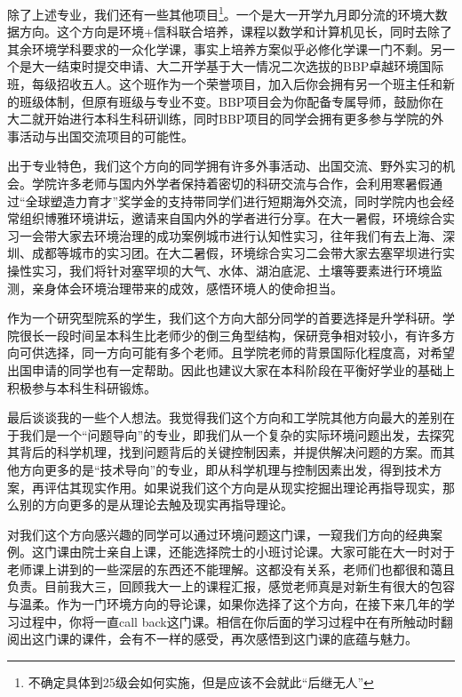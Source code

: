 \vspace{10pt}

除了上述专业，我们还有一些其他项目\footnote{不确定具体到25级会如何实施，但是应该不会就此“后继无人”}。一个是大一开学九月即分流的环境大数据方向。这个方向是环境+信科联合培养，课程以数学和计算机见长，同时去除了其余环境学科要求的一众化学课，事实上培养方案似乎必修化学课一门不剩。另一个是大一结束时提交申请、大二开学基于大一情况二次选拔的BBP卓越环境国际班，每级招收五人。这个班作为一个荣誉项目，加入后你会拥有另一个班主任和新的班级体制，但原有班级与专业不变。BBP项目会为你配备专属导师，鼓励你在大二就开始进行本科生科研训练，同时BBP项目的同学会拥有更多参与学院的外事活动与出国交流项目的可能性。

\vspace{10pt}

出于专业特色，我们这个方向的同学拥有许多外事活动、出国交流、野外实习的机会。学院许多老师与国内外学者保持着密切的科研交流与合作，会利用寒暑假通过“全球塑造力育才”奖学金的支持带同学们进行短期海外交流，同时学院内也会经常组织博雅环境讲坛，邀请来自国内外的学者进行分享。在大一暑假，环境综合实习一会带大家去环境治理的成功案例城市进行认知性实习，往年我们有去上海、深圳、成都等城市的实习团。在大二暑假，环境综合实习二会带大家去塞罕坝进行实操性实习，我们将针对塞罕坝的大气、水体、湖泊底泥、土壤等要素进行环境监测，亲身体会环境治理带来的成效，感悟环境人的使命担当。

\vspace{10pt}

作为一个研究型院系的学生，我们这个方向大部分同学的首要选择是升学科研。学院很长一段时间呈本科生比老师少的倒三角型结构，保研竞争相对较小，有许多方向可供选择，同一方向可能有多个老师。且学院老师的背景国际化程度高，对希望出国申请的同学也有一定帮助。因此也建议大家在本科阶段在平衡好学业的基础上积极参与本科生科研锻炼。

\vspace{10pt}

最后谈谈我的一些个人想法。我觉得我们这个方向和工学院其他方向最大的差别在于我们是一个“问题导向”的专业，即我们从一个复杂的实际环境问题出发，去探究其背后的科学机理，找到问题背后的关键控制因素，并提供解决问题的方案。而其他方向更多的是“技术导向”的专业，即从科学机理与控制因素出发，得到技术方案，再评估其现实作用。如果说我们这个方向是从现实挖掘出理论再指导现实，那么别的方向更多的是从理论去触及现实再指导理论。

\vspace{10pt}

对我们这个方向感兴趣的同学可以通过环境问题这门课，一窥我们方向的经典案例。这门课由院士亲自上课，还能选择院士的小班讨论课。大家可能在大一时对于老师课上讲到的一些深层的东西还不能理解。这都没有关系，老师们也都很和蔼且负责。目前我大三，回顾我大一上的课程汇报，感觉老师真是对新生有很大的包容与温柔。作为一门环境方向的导论课，如果你选择了这个方向，在接下来几年的学习过程中，你将一直call back这门课。相信在你后面的学习过程中在有所触动时翻阅出这门课的课件，会有不一样的感受，再次感悟到这门课的底蕴与魅力。

